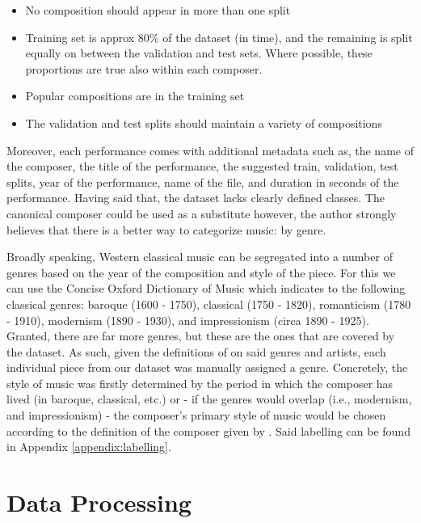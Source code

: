 \documentclass[a4paper]{book}
\begin{document}
\begin{itemize}
    \item No composition should appear in more than one split
    \item Training set is approx 80\% of the dataset (in time), and the remaining is split equally on between the validation and test sets. Where possible, these proportions are true also within each composer.
    \item Popular compositions are in the training set
    \item The validation and test splits should maintain a variety of compositions
\end{itemize}

Moreover, each performance comes with additional metadata such as, the name of the composer, the title of the performance, the suggested train, validation, test splits, year of the performance, name of the file, and duration in seconds of the performance. Having said that, the dataset lacks clearly defined classes. The canonical composer could be used as a substitute however, the author strongly believes that there is a better way to categorize music: by genre.

Broadly speaking, Western classical music can be segregated into a number of genres based on the year of the composition and style of the piece. For this we can use the Concise Oxford Dictionary of Music \parencite{kennedy_concise_2007} which indicates to the following classical genres: baroque (1600 - 1750), classical (1750 - 1820), romanticism (1780 - 1910), modernism (1890 - 1930), and impressionism (circa 1890 - 1925). Granted, there are far more genres, but these are the ones that are covered by the dataset. As such, given the definitions of \textcite{kennedy_concise_2007} on said genres and artists, each individual piece from our dataset was manually assigned a genre. Concretely, the style of music was firstly determined by the period in which the composer has lived (in baroque, classical, etc.) or - if the genres would overlap (i.e., modernism, and impressionism) - the composer's primary style of music would be chosen according to the definition of the composer given by \textcite{kennedy_concise_2007}. Said labelling can be found in Appendix \ref{appendix:labelling}.

\section{Data Processing} \label{sec:data_proc}
\end{document}
